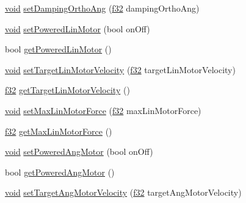 \begin{DoxyCompactItemize}
\mbox{\hyperlink{_thread_8h_af1e856da2e658414cb2456cb6f7ebc66}{void}} \mbox{\hyperlink{classnjli_1_1_physics_constraint_slider_a08c148b76585f4d2abe9f8569db6e311}{set\+Damping\+Ortho\+Ang}} (\mbox{\hyperlink{_util_8h_a5f6906312a689f27d70e9d086649d3fd}{f32}} damping\+Ortho\+Ang)
\item 
\mbox{\hyperlink{_thread_8h_af1e856da2e658414cb2456cb6f7ebc66}{void}} \mbox{\hyperlink{classnjli_1_1_physics_constraint_slider_a442e22e2e620cd3aa19451c239bf7fe5}{set\+Powered\+Lin\+Motor}} (bool on\+Off)
\item 
bool \mbox{\hyperlink{classnjli_1_1_physics_constraint_slider_a7516538fdd1c4defda6def5290e93eb8}{get\+Powered\+Lin\+Motor}} ()
\item 
\mbox{\hyperlink{_thread_8h_af1e856da2e658414cb2456cb6f7ebc66}{void}} \mbox{\hyperlink{classnjli_1_1_physics_constraint_slider_adb621e16230cb8e01b05738667e9944b}{set\+Target\+Lin\+Motor\+Velocity}} (\mbox{\hyperlink{_util_8h_a5f6906312a689f27d70e9d086649d3fd}{f32}} target\+Lin\+Motor\+Velocity)
\item 
\mbox{\hyperlink{_util_8h_a5f6906312a689f27d70e9d086649d3fd}{f32}} \mbox{\hyperlink{classnjli_1_1_physics_constraint_slider_ab66ac3f4e1e63a699a3ebadf275b6437}{get\+Target\+Lin\+Motor\+Velocity}} ()
\item 
\mbox{\hyperlink{_thread_8h_af1e856da2e658414cb2456cb6f7ebc66}{void}} \mbox{\hyperlink{classnjli_1_1_physics_constraint_slider_ab8528b7eba6a82b9dfaed9d246ba784f}{set\+Max\+Lin\+Motor\+Force}} (\mbox{\hyperlink{_util_8h_a5f6906312a689f27d70e9d086649d3fd}{f32}} max\+Lin\+Motor\+Force)
\item 
\mbox{\hyperlink{_util_8h_a5f6906312a689f27d70e9d086649d3fd}{f32}} \mbox{\hyperlink{classnjli_1_1_physics_constraint_slider_ae4a60d9f5ce61a7a9ab432573ebadc2a}{get\+Max\+Lin\+Motor\+Force}} ()
\item 
\mbox{\hyperlink{_thread_8h_af1e856da2e658414cb2456cb6f7ebc66}{void}} \mbox{\hyperlink{classnjli_1_1_physics_constraint_slider_a3485779b1dbe5d3d7922d71df253cb9e}{set\+Powered\+Ang\+Motor}} (bool on\+Off)
\item 
bool \mbox{\hyperlink{classnjli_1_1_physics_constraint_slider_a6ad2fb16e03ebf5f93a83f762de206d9}{get\+Powered\+Ang\+Motor}} ()
\item 
\mbox{\hyperlink{_thread_8h_af1e856da2e658414cb2456cb6f7ebc66}{void}} \mbox{\hyperlink{classnjli_1_1_physics_constraint_slider_a0c5c5803511412299e72f8ab147b6c9e}{set\+Target\+Ang\+Motor\+Velocity}} (\mbox{\hyperlink{_util_8h_a5f6906312a689f27d70e9d086649d3fd}{f32}} target\+Ang\+Motor\+Velocity)

\end{DoxyCompactItemize}
